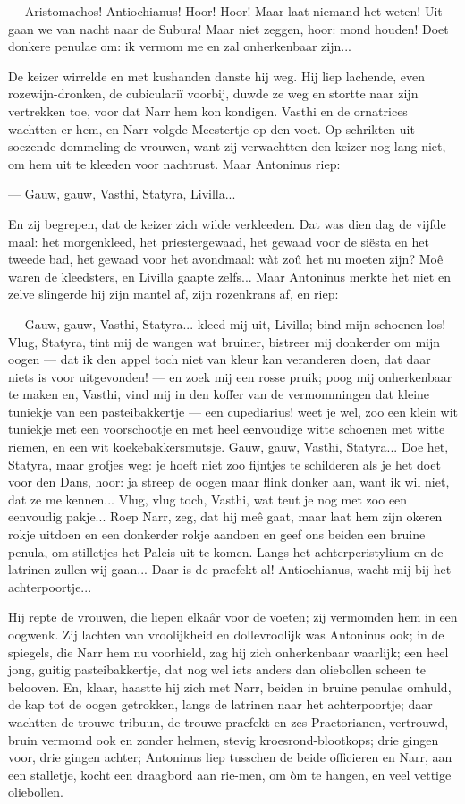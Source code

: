 \documentclass[a4paper, 12pt, oneside, dutch]{article}
\begin{document}
--- Aristomachos! Antiochianus! Hoor! Hoor! Maar laat niemand het weten! Uit gaan we van nacht naar de Subura! Maar niet zeggen, hoor: mond houden! Doet donkere penulae om: ik vermom me en zal onherkenbaar zijn...

De keizer wirrelde en met kushanden danste hij weg. Hij liep lachende, even rozewijn-dronken, de cubiculariï voorbij, duwde ze weg en stortte naar zijn vertrekken toe, voor dat Narr hem kon kondigen. Vasthi en de ornatrices wachtten er hem, en Narr volgde Meestertje op den voet. Op schrikten uit soezende dommeling de vrouwen, want zij verwachtten den keizer nog lang niet, om hem uit te kleeden voor nachtrust. Maar Antoninus riep:

--- Gauw, gauw, Vasthi, Statyra, Livilla...

En zij begrepen, dat de keizer zich wilde verkleeden. Dat was dien dag de vijfde maal: het morgenkleed, het priestergewaad, het gewaad voor de siësta en het tweede bad, het gewaad voor het avondmaal: wàt zoû het nu moeten zijn? Moê waren de kleedsters, en Livilla gaapte zelfs... Maar Antoninus merkte het niet en zelve slingerde hij zijn mantel af, zijn rozenkrans af, en riep:

--- Gauw, gauw, Vasthi, Statyra... kleed mij uit, Livilla; bind mijn schoenen los! Vlug, Statyra, tint mij de wangen wat bruiner, bistreer mij donkerder om mijn oogen --- dat ik den appel toch niet van kleur kan veranderen doen, dat daar niets is voor uitgevonden! --- en zoek mij een rosse pruik; poog mij onherkenbaar te maken en, Vasthi, vind mij in den koffer van de vermommingen dat kleine tuniekje van een pasteibakkertje --- een cupediarius! weet je wel, zoo een klein wit tuniekje met een voorschootje en met heel eenvoudige witte schoenen met witte riemen, en een wit koekebakkersmutsje. Gauw, gauw, Vasthi, Statyra... Doe het, Statyra, maar grofjes weg: je hoeft niet zoo fijntjes te schilderen als je het doet voor den Dans, hoor: ja streep de oogen maar flink donker aan, want ik wil niet, dat ze me kennen... Vlug, vlug toch, Vasthi, wat teut je nog met zoo een eenvoudig pakje... Roep Narr, zeg, dat hij meê gaat, maar laat hem zijn okeren rokje uitdoen en een donkerder rokje aandoen en geef ons beiden een bruine penula, om stilletjes het Paleis uit te komen. Langs het achterperistylium en de latrinen zullen wij gaan... Daar is de praefekt al! Antiochianus, wacht mij bij het achterpoortje...

Hij repte de vrouwen, die liepen elkaâr voor de voeten; zij vermomden hem in een oogwenk. Zij lachten van vroolijkheid en dollevroolijk was Antoninus ook; in de spiegels, die Narr hem nu voorhield, zag hij zich onherkenbaar waarlijk; een heel jong, guitig pasteibakkertje, dat nog wel iets anders dan oliebollen scheen te belooven. En, klaar, haastte hij zich met Narr, beiden in bruine penulae omhuld, de kap tot de oogen getrokken, langs de latrinen naar het achterpoortje; daar wachtten de trouwe tribuun, de trouwe praefekt en zes Praetorianen, vertrouwd, bruin vermomd ook en zonder helmen, stevig kroesrond-blootkops; drie gingen voor, drie gingen achter; Antoninus liep tusschen de beide officieren en Narr, aan een stalletje, kocht een draagbord aan rie-men, om òm te hangen, en veel vettige oliebollen.
\end{document}
